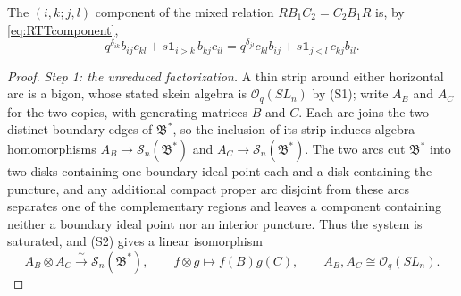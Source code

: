 \documentclass[11pt]{article}
\theoremstyle{remark}
\newcommand{\Skein}{\mathcal S_n}
\newcommand{\Bstar}{\mathfrak B^*}
\newcommand{\ot}{\otimes}
\newcommand{\Oq}{\mathcal O_q(SL_n)}
\begin{document}
The $(i,k;j,l)$ component of the mixed relation $RB_1C_2=C_2B_1R$ is,
by \eqref{eq:RTTcomponent},
\begin{equation}\label{eq:mixedcomponent}
 q^{\delta_{ik}}b_{ij}c_{kl}+s\mathbf1_{i>k}\,b_{kj}c_{il}
 =q^{\delta_{jl}}c_{kl}b_{ij}+s\mathbf1_{j<l}\,c_{kj}b_{il}.
\end{equation}

\begin{proof}
\emph{Step 1: the unreduced factorization.}
A thin strip around either horizontal arc is a bigon, whose stated
skein algebra is $\Oq$ by (S1); write $A_B$ and $A_C$ for the two
copies, with generating matrices $B$ and $C$. Each arc joins the two
distinct boundary edges of $\Bstar$, so the inclusion of its strip
induces algebra homomorphisms $A_B\to\Skein(\Bstar)$ and
$A_C\to\Skein(\Bstar)$. The two arcs cut $\Bstar$ into two disks
containing one boundary ideal point each and a disk containing the
puncture, and any additional compact proper arc disjoint from these
arcs separates one of the complementary regions and leaves a component
containing neither a boundary ideal point nor an interior puncture.
Thus the system is saturated, and (S2) gives a linear isomorphism
\begin{equation}\label{eq:fullfactor}
 A_B\ot A_C\xrightarrow{\ \sim\ }\Skein(\Bstar),\qquad
 f\ot g\longmapsto f(B)g(C),\qquad A_B,A_C\cong\Oq .
\end{equation}


\end{proof}
\end{document}
